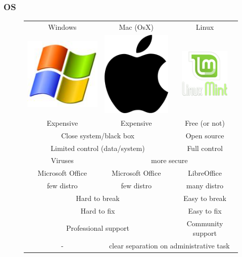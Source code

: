 \documentclass{beamer}
\begin{document}
\begin{frame}
\frametitle{OS}
\begin{figure}
\begin{center}
\begin{tabular}{|ccc|}
\hline
Windows & Mac (OsX) & Linux\\
\includegraphics[scale=0.2]{windows.jpg} & \includegraphics[scale=0.2]{apple.png} & \includegraphics[scale=0.2]{mint.png}\\

\hline
Expensive & Expensive & Free (or not)\\
\multicolumn{2}{|c}{Close system/black box} & Open source\\
\multicolumn{2}{|c}{Limited control (data/system)} & Full control \\
Viruses &  \multicolumn{2}{c}{more secure}\\
Microsoft Office & Microsoft Office & LibreOffice \\
few distro & few distro & many distro\\
\multicolumn{2}{|c}{Hard to break} & Easy to break\\
\multicolumn{2}{|c}{Hard to fix} & Easy to fix\\
\multicolumn{2}{|c}{Professional support} & Community support \\
- & \multicolumn{2}{c|}{clear separation on administrative task}\\
\hline
\end{tabular}
\end{center}
\end{figure}
\end{frame}
\end{document}
